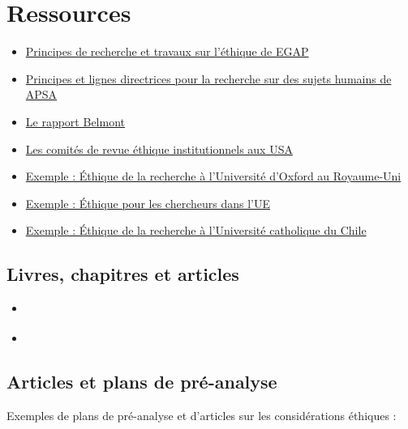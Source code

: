 \documentclass[12pt,]{book}
\begin{document}
\hypertarget{ressources-8}{%
\section{Ressources}\label{ressources-8}}

\begin{itemize}
\item
  \href{https://egap.org/ethics/}{Principes de recherche et travaux sur l'éthique de EGAP}
\item
  \href{https://connect.apsanet.org/hsr/principles-and-guidance/}{Principes et lignes directrices pour la recherche sur des sujets humains de APSA}
\item
  \href{https://www.hhs.gov/ohrp/regulations-and-policy/belmont-report/index.html}{Le rapport Belmont}
\item
  \href{https://www.youtube.com/watch?v=U8fme1boEbE}{Les comités de revue éthique institutionnels aux USA}
\item
  \href{https://researchsupport.admin.ox.ac.uk/governance/ethics}{Exemple : Éthique de la recherche à l'Université d'Oxford au Royaume-Uni}
\item
  \href{https://ec.europa.eu/research/participants/data/ref/fp7/89888/ethics-for-researchers_en.pdf}{Exemple : Éthique pour les chercheurs dans l'UE}
\item
  \href{http://eticayseguridad.uc.cl/}{Exemple : Éthique de la recherche à l'Université catholique du Chile}
\end{itemize}

\hypertarget{livres-chapitres-et-articles-6}{%
\subsection{Livres, chapitres et articles}\label{livres-chapitres-et-articles-6}}

\begin{itemize}
\item
  \autocite{Asieduetal2021ethics}
\item
  \autocite{Evans2021ethics} 
\end{itemize}

\hypertarget{articles-et-plans-de-pruxe9-analyse}{%
\subsection{Articles et plans de pré-analyse}\label{articles-et-plans-de-pruxe9-analyse}}

Exemples de plans de pré-analyse et d'articles sur les considérations éthiques :
\end{document}
